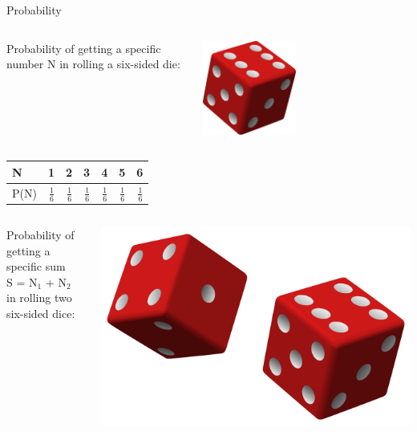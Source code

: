 \begin{frame}{Probability}

    \begin{columns}
        \begin{column}{0.65\textwidth}
        Probability of getting a specific number N in rolling a six-sided die:
        \end{column}
        \begin{column}{0.25\textwidth}
        \includegraphics[width=0.45\textwidth]{gfx/web/die}
        \end{column}
    \end{columns}
    
    \begin{tabular}{l | r r r r r r}
        N & 1 & 2 & 3 & 4 & 5 & 6 \\
        \hline
        P(N) & $\frac{1}{6}$ & $\frac{1}{6}$ & $\frac{1}{6}$ & $\frac{1}{6}$ & $\frac{1}{6}$ & $\frac{1}{6}$ \\
    \end{tabular}
    
    \bigskip
    \begin{columns}
        \begin{column}{0.65\textwidth}
            Probability of getting a specific sum\\
            S = N$_1$ + N$_2$ in rolling two six-sided dice:
        \end{column}
        \begin{column}{0.25\textwidth}
            \includegraphics[width=\textwidth]{gfx/web/dice.png}
        \end{column}
    \end{columns}
    

\end{frame}

